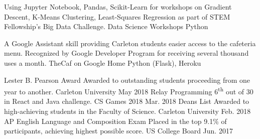 \documentclass[]{awesome-cv}
\begin{document}
\vspace{-4mm}
\begin{cventries}
    \cventry
        {Using Jupyter Notebook, Pandas, Scikit-Learn for workshops on Gradient Descent, K-Means Clustering, Least-Squares Regression as part of STEM Fellowship's Big Data Challenge.}
        {Data Science Workshops}
        {Python}
        {}
        {}
   	
    \vspace{-5.5mm}
    \cventry
	{A Google Assistant skill providing Carleton students easier access to the cafeteria menu. Recognized by Google Developer Program for receiving several thousand uses a month.}
	{TheCaf on Google Home}
	{Python (Flask), Heroku}
	{}
    {}
\end{cventries}

\vspace{-6mm}
\begin{cvhonors}
	\cvhonor
	{Lester B. Pearson Award}
	{Awarded to outstanding students proceeding from one year to another.}
	{Carleton University}
	{May 2018}
    \cvhonor
    {Relay Programming}
	{6\textsuperscript{th} out of 30 in React and Java challenge.}
	{CS Games 2018}
	{Mar. 2018}
	\cvhonor
    {Dean\textquotesingle{}s List}
	{Awarded to high-achieving students in the Faculty of Science.}
	{Carleton University}
	{Feb. 2018}
	\cvhonor
	{AP English Language and Composition Exam}
	{Placed in the top 9.1\% of participants, achieving highest possible score.}
	{US College Board}
	{Jun. 2017}
\end{cvhonors}
\ 
\end{document}
